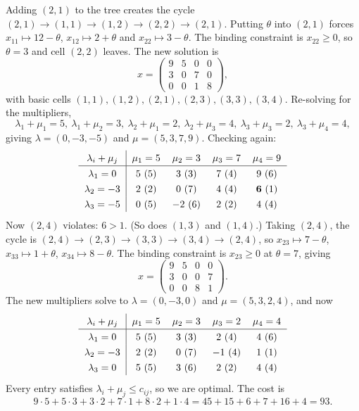 \documentclass[a4paper]{scrartcl}
\begin{document}
\begin{example}
    Adding $(2,1)$ to the tree creates the cycle $(2,1) \rightarrow (1,1) \rightarrow (1,2) \rightarrow (2,2) \rightarrow (2,1)$. Putting $\theta$ into $(2,1)$ forces $x_{11} \mapsto 12 - \theta$, $x_{12}\mapsto 2 + \theta$ and $x_{22}\mapsto 3 - \theta$. The binding constraint is $x_{22} \geq 0$, so $\theta = 3$ and cell $(2,2)$ leaves. The new solution is
    $$
    x = \begin{pmatrix}9 & 5 & 0 & 0\\3&0&7&0\\0&0&1&8\end{pmatrix},
    $$
    with basic cells $(1,1),(1,2),(2,1),(2,3),(3,3),(3,4)$. Re-solving for the multipliers,
    $$
    \lambda_1 + \mu_1 = 5,\ \lambda_1+\mu_2 = 3,\ \lambda_2 + \mu_1 = 2,\ \lambda_2 + \mu_3 = 4,\ \lambda_3 + \mu_3 = 2,\ \lambda_3+\mu_4 = 4,
    $$
    giving $\lambda = (0,-3,-5)$ and $\mu = (5,3,7,9)$. Checking again:
    $$
    \arraycolsep=6pt\def\arraystretch{1.3}
    \begin{array}{c|cccc}
        \lambda_i + \mu_j & \mu_1 = 5 & \mu_2 = 3 & \mu_3 = 7 & \mu_4 = 9\\\hline
        \lambda_1 = 0 & 5\ (5) & 3\ (3) & 7\ (4) & 9\ (6)\\
        \lambda_2 = -3 & 2\ (2) & 0\ (7) & 4\ (4) & \mathbf{6}\ (1)\\
        \lambda_3 = -5 & 0\ (5) & -2\ (6) & 2\ (2) & 4\ (4)
    \end{array}
    $$
    Now $(2,4)$ violates: $6 > 1$. (So does $(1,3)$ and $(1,4)$.) Taking $(2,4)$, the cycle is $(2,4)\rightarrow(2,3)\rightarrow(3,3)\rightarrow(3,4)\rightarrow(2,4)$, so $x_{23}\mapsto 7 - \theta$, $x_{33}\mapsto 1 + \theta$, $x_{34}\mapsto 8 - \theta$. The binding constraint is $x_{23} \geq 0$ at $\theta = 7$, giving
    $$
    x = \begin{pmatrix}9&5&0&0\\3&0&0&7\\0&0&8&1\end{pmatrix}.
    $$
    The new multipliers solve to $\lambda = (0,-3,0)$ and $\mu = (5,3,2,4)$, and now
    $$
    \arraycolsep=6pt\def\arraystretch{1.3}
    \begin{array}{c|cccc}
        \lambda_i + \mu_j & \mu_1 = 5 & \mu_2 = 3 & \mu_3 = 2 & \mu_4 = 4\\\hline
        \lambda_1 = 0 & 5\ (5) & 3\ (3) & 2\ (4) & 4\ (6)\\
        \lambda_2 = -3 & 2\ (2) & 0\ (7) & -1\ (4) & 1\ (1)\\
        \lambda_3 = 0 & 5\ (5) & 3\ (6) & 2\ (2) & 4\ (4)
    \end{array}
    $$
    Every entry satisfies $\lambda_i + \mu_j \leq c_{ij}$, so we are optimal. The cost is
    $$
    9\cdot 5 + 5\cdot 3 + 3\cdot 2 + 7\cdot 1 + 8\cdot 2 + 1\cdot 4 = 45+15+6+7+16+4 = 93.
    $$
\end{example}
\end{document}
